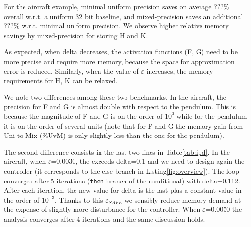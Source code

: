 For the aircraft example, minimal uniform precision saves on average ???\%
overall w.r.t. a uniform 32 bit baseline, and mixed-precision saves an
additional ???\% w.r.t. minimal uniform precision. We observe higher relative
memory savings by mixed-precision for storing H and K.


As expected, when delta decreases, the activation functions (F, G) need to be
more precise and require more memory, because the space for approximation error
is reduced. Similarly, when the value of $\varepsilon$ increases, the memory
requirements for H, K can be relaxed.

We note two differences among these two benchmarks.
In the aircraft,
the precision for F and G is almost double with respect to the pendulum. This is
because the magnitude of F and G is on the order of $10^{3}$ while for the
pendulum it is on the order of several units (note that for F and G the memory gain
from Uni to Mix (\%UvM) is only slightly less than the one for the pendulum).

The second difference consists in the last two lines in Table\ref{tab:ipd}.
In the aircraft, when $\varepsilon$=0.0030, the \maxUij exceeds delta=0.1 and we
need to design again the controller (it corresponds to the else branch in
Listing\ref{fig:overview}). The loop converges after 5 iterations (\texttt{then}
branch of the conditional) with delta=0.112. After each iteration, the new value
for delta is the last \maxUij\space plus a constant value in the order of
$10^{-3}$. Thanks to this $\varepsilon_{SAFE}$ we sensibly reduce memory demand
at the expense of slightly more disturbance for the controller. When
$\varepsilon$=0.0050 the analysis converges after 4 iterations and the same
discussion holds.


